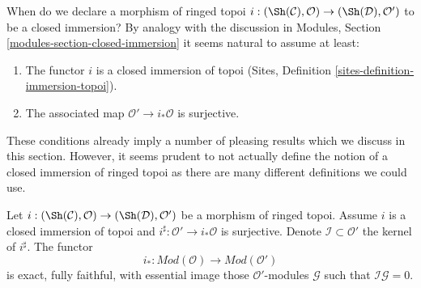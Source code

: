 \noindent
When do we declare a morphism of ringed topoi
$i : (\Sh(\mathcal{C}), \mathcal{O}) \to (\Sh(\mathcal{D}), \mathcal{O}')$
to be a closed immersion? By analogy with the discussion in
Modules, Section \ref{modules-section-closed-immersion}
it seems natural to assume at least:
\begin{enumerate}
\item The functor $i$ is a closed immersion of topoi
(Sites, Definition \ref{sites-definition-immersion-topoi}).
\item The associated map $\mathcal{O}' \to i_*\mathcal{O}$ is surjective.
\end{enumerate}
These conditions already imply a number of pleasing results which we discuss
in this section. However, it seems prudent to not actually define the
notion of a closed immersion of ringed topoi as there are many different
definitions we could use.

\begin{lemma}
\label{lemma-i-star-equivalence}
Let $i : (\Sh(\mathcal{C}), \mathcal{O}) \to (\Sh(\mathcal{D}), \mathcal{O}')$
be a morphism of ringed topoi. Assume $i$ is a closed immersion of topoi
and $i^\sharp : \mathcal{O}' \to i_*\mathcal{O}$ is surjective.
Denote $\mathcal{I} \subset \mathcal{O}'$ the kernel of $i^\sharp$.
The functor
$$
i_* :
\textit{Mod}(\mathcal{O})
\longrightarrow
\textit{Mod}(\mathcal{O}')
$$
is exact, fully faithful, with essential image those
$\mathcal{O}'$-modules $\mathcal{G}$ such that $\mathcal{I}\mathcal{G} = 0$.
\end{lemma}


